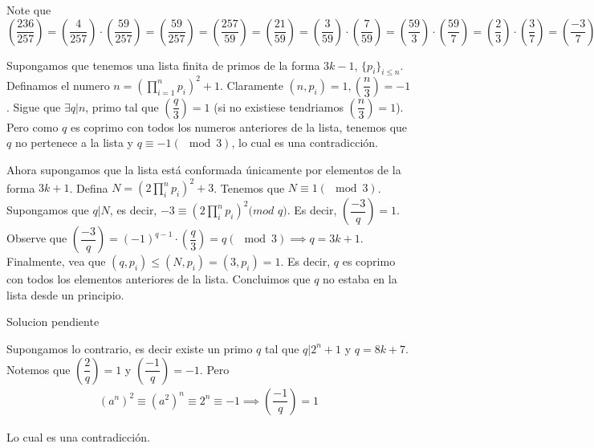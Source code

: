 \begin{sol}
	Note que $\left(\dfrac{236}{257}\right)  = \left(\dfrac{4}{257}\right) \cdot  \left(\dfrac{59}{257}\right) = \left(\dfrac{59}{257}\right) = \left(\dfrac{257}{59}\right) = \left(\dfrac{21}{59}\right) = \left(\dfrac{3}{59}\right) \cdot \left(\dfrac{7}{59}\right) = \left(\dfrac{59}{3}\right) \cdot \left(\dfrac{59}{7}\right) = \left(\dfrac{2}{3}\right) \cdot \left(\dfrac{3}{7}\right) = \left(\dfrac{-3}{7}\right) = \left(\dfrac{4}{7}\right) = 1$
\end{sol}

\begin{sol}
	Supongamos que tenemos una lista finita de primos de la forma $3k-1$, $\{p_{i}\}_{i\leq n}$. Definamos el numero $n = \left( \prod_{i=1}^{n} p_{i} \right)^{2} + 1$. Claramente $(n, p_{i}) = 1, \left(\dfrac{n}{3}\right) = -1$. Sigue que $\exists q | n$, primo tal que $ \left(\dfrac{q}{3}\right) = 1$ (si no existiese tendriamos $\left(\dfrac{n}{3}\right) = 1$). Pero como $q$ es coprimo con todos los numeros anteriores de la lista, tenemos que $q$ no pertenece a la lista y $q \equiv -1 (\mod 3)$, lo cual es una contradicci\'on.
	
	Ahora supongamos que la lista est\'a conformada \'unicamente por elementos de la forma $3k+1$. Defina $N = (2 \prod_{i}^{n} p_{i})^{2} + 3$. Tenemos que $N \equiv 1 (\mod 3)$. Supongamos que $q|N$, es decir, $-3 \equiv (2 \prod_{i}^{n} p_{i})^{2} (mod$ $q)$. Es decir, $\left(\dfrac{-3}{q}\right) = 1$. Observe que $\left(\dfrac{-3}{q}\right) = (-1)^{q-1} \cdot \left(\dfrac{q}{3}\right) = q (\mod 3) \implies q = 3k+1$. Finalmente, vea que $(q, p_{i}) \leq (N, p_{i}) = (3,p_{i}) = 1$. Es decir, $q$ es coprimo con todos los elementos anteriores de la lista. Concluimos que $q$ no estaba en la lista desde un principio.
\end{sol}

\begin{sol}
	Solucion pendiente
\end{sol}

\begin{sol}
	Supongamos lo contrario, es decir existe un primo $q$ tal que $q | 2^{n}+1$ y $q = 8k +7$. Notemos que $\left(\dfrac{2}{q}\right) = 1$ y $\left(\dfrac{-1}{q}\right) =-1$. Pero 
	\begin{align}
	\left(a^{n}\right)^{2} \equiv \left(a^{2}\right)^{n} \equiv 2^{n} \equiv -1 \implies \left(\dfrac{-1}{q}\right) = 1
	\end{align}
	
	Lo cual es una contradicci\'on. 
\end{sol}

